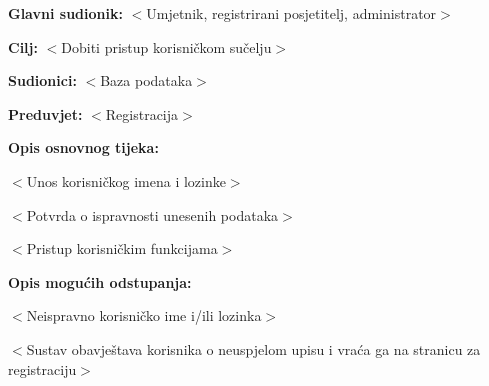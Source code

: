 							\noindent {}
							\begin{packed_item}
								
								\item \textbf{Glavni sudionik: }$<$Umjetnik, registrirani posjetitelj, administrator$>$
								\item  \textbf{Cilj:} $<$Dobiti pristup korisničkom sučelju$>$
								\item  \textbf{Sudionici:} $<$Baza podataka$>$
								\item  \textbf{Preduvjet:} $<$Registracija$>$
								\item  \textbf{Opis osnovnog tijeka:}
								
								\item[] \begin{packed_enum}
									
									\item $<$Unos korisničkog imena i lozinke$>$
									\item $<$Potvrda o ispravnosti unesenih podataka$>$
									\item $<$Pristup korisničkim funkcijama$>$
								\end{packed_enum}
								
								\item  \textbf{Opis mogućih odstupanja:}
								
								\item[] \begin{packed_item}
									
									\item[2.a] $<$Neispravno korisničko ime i/ili lozinka$>$
									\item[] \begin{packed_enum}
										
										\item $<$Sustav obavještava korisnika o neuspjelom upisu i 
										vraća ga na stranicu za registraciju$>$
										
									\end{packed_enum}							
									
								\end{packed_item}
							\end{packed_item}
					
